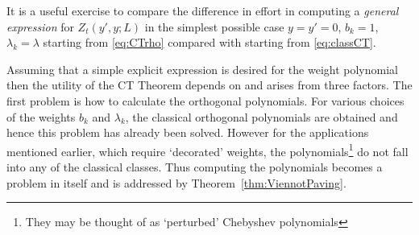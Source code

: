 \documentclass[11pt,a4paper]{article}
\newcommand{\la}{\lambda}
\begin{document}
It is a useful exercise to  compare the difference in effort in  computing a \emph{general expression} for $Z_t(y',y;L)$ in the simplest possible case $y=y'=0$,  $b_k=1$, $\la_k=\la$  starting from \eqref{eq:CTrho} compared with starting from \eqref{eq:classCT}.


 


Assuming that a simple explicit expression is desired for the weight polynomial then the utility of the CT Theorem depends on and arises from three factors. The first problem is how to calculate the orthogonal polynomials. For various choices of the weights    $b_k$ and $\la_k$, the classical orthogonal polynomials are obtained and hence this problem has already been solved. However  for the applications mentioned earlier, which require `decorated' weights, the polynomials\footnote{They may  be thought of as `perturbed' Chebyshev polynomials} do not fall into any of the classical classes. Thus computing the polynomials becomes a problem in itself and is addressed by Theorem~\ref{thm:ViennotPaving}.  
\end{document}
